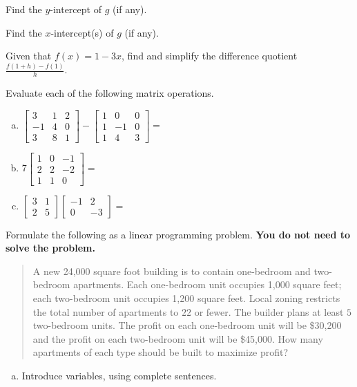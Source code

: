\documentclass[12pt,legalpaper]{exam}
\newcommand{\MATRIX}[2]{\ensuremath{\left[\begin{array}{#1}#2\end{array}\right]}}
\newcommand{\ds}{\displaystyle}
\begin{document}
\begin{questions}
\begin{compactenum}[(a)]
\item Find the $y$-intercept of $g$ (if any).
\vspace{5cm}

\item Find the $x$-intercept(s) of $g$ (if any).
\vspace{5cm}
\end{compactenum}
\newpage

\question[3] Given that $f(x) = 1 - 3x$, find and simplify the difference quotient $\ds{\frac{f(1 + h) - f(1)}{h}}$.
\vspace{8cm}

\question[6] Evaluate each of the following matrix operations.
\begin{enumerate}[(a)]
\item $\MATRIX{rrr}{3 & 1 & 2\\-1 & 4 & 0\\3 & 8 & 1} - \MATRIX{rrr}{1 & 0 & 0\\1 & -1 & 0\\1 & 4 & 3} = $
\vfill

\item $7\MATRIX{rrr}{1 & 0 & -1\\2 & 2 & -2\\1 & 1 & 0} = $
\vfill

\item $\MATRIX{rr}{3 & 1\\2 & 5}\MATRIX{rr}{-1 & 2\\0 & -3} = $
\vfill
\end{enumerate}
\newpage

\question[5] Formulate the following as a linear programming problem.  \textbf{You do not need to solve the problem.}
\begin{quote}
A new 24,000 square foot building is to contain one-bedroom and two-bedroom apartments.  Each one-bedroom unit occupies 1,000 square feet; each two-bedroom unit occupies 1,200 square feet.  Local zoning restricts the total number of apartments to $22$ or fewer.  The builder plans at least $5$ two-bedroom units.  The profit on each one-bedroom unit will be \$30,200 and the profit on each two-bedroom unit will be \$45,000.  How many apartments of each type should be built to maximize profit?
\end{quote}
\begin{enumerate}[(a)]
\item Introduce variables, using complete sentences.
\vspace{4cm}


\end{enumerate}
\end{questions}
\end{document}
